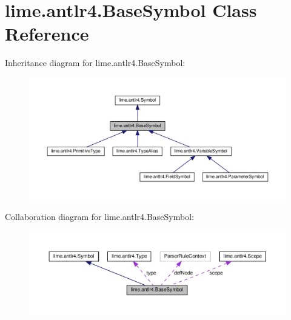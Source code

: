 \hypertarget{classlime_1_1antlr4_1_1BaseSymbol}{}\section{lime.\+antlr4.\+Base\+Symbol Class Reference}
\label{classlime_1_1antlr4_1_1BaseSymbol}


Inheritance diagram for lime.\+antlr4.\+Base\+Symbol\+:
\nopagebreak
\begin{figure}[H]
\begin{center}
\leavevmode
\includegraphics[width=350pt]{classlime_1_1antlr4_1_1BaseSymbol__inherit__graph}
\end{center}
\end{figure}


Collaboration diagram for lime.\+antlr4.\+Base\+Symbol\+:
\nopagebreak
\begin{figure}[H]
\begin{center}
\leavevmode
\includegraphics[width=350pt]{classlime_1_1antlr4_1_1BaseSymbol__coll__graph}
\end{center}
\end{figure}
